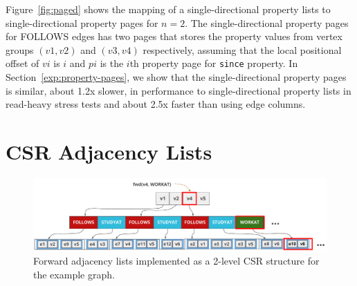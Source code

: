 Figure~\ref{fig:paged} shows the mapping of a single-directional property lists to single-directional  property pages for $n=2$. The single-directional property pages for FOLLOWS edges has two pages that stores the property values from vertex groups $(v1,v2)$ and $(v3,v4)$ respectively, assuming that the local positional offset of $vi$ is $i$ and $pi$ is the $i$th property page for \texttt{since} property. 
In Section~\ref{exp:property-pages}, we show that the single-directional  property pages is similar, about 1.2x slower, in performance to single-directional property lists in read-heavy stress tests and about 2.5x faster than using edge columns. 

\section{CSR Adjacency Lists}
\label{sec:adjacency-lists}

\begin{figure}
	\hspace{-15pt}
	\hfill\includegraphics[scale=0.75]{img/adjlists}\hspace*{\fill}
	\captionsetup{justification=centering}
	\caption{Forward adjacency lists implemented as a 2-level CSR structure for the example graph.}
	\label{fig:adjlists}
\end{figure}

